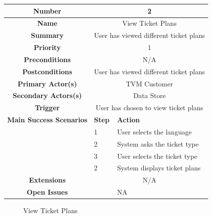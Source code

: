 \documentclass[a4paper,12pt]{report}
\begin{document}
\begin{tabular}{ | c | p{2cm} | p{7cm} |}
	
	\hline
	\textbf{Number} & \multicolumn{2}{c|}{2}  \\
	\hline
	\textbf{Name} & \multicolumn{2}{c|}{View Ticket Plans}  \\
	\hline
	\textbf{Summary} & \multicolumn{2}{c|}{User has viewed different ticket plans}  \\
	\hline
	\textbf{Priority} & \multicolumn{2}{c|}{1}  \\
	\hline
	\textbf{Preconditions} & \multicolumn{2}{c|}{N/A}  \\
	\hline
	\textbf{Postconditions} & \multicolumn{2}{c|}{User has viewed different ticket plans}  \\
	\hline
	\textbf{Primary Actor(s)} & \multicolumn{2}{c|}{TVM Customer}  \\
	\hline
	\textbf{Secondary Actors(s)} & \multicolumn{2}{c|}{Data Store}  \\
	\hline
	\textbf{Trigger} & \multicolumn{2}{c|}{User has chosen to view ticket plans}  \\
	\hline
	\textbf{Main Success Scenarios} & \textbf{Step} & \textbf{Action} \\
	\hline
	& 1 & User selects the language \\ 
	\hline
	&  2  & System asks the ticket type \\
	\hline
	&  3  & User selects the ticket type \\
	\hline
	&  2  & System displays ticket plans \\
	\hline
	\textbf{Extensions} & \multicolumn{2}{c|}{N/A}  \\
	\hline
	\textbf{Open Issues} &    & NA \\
	\hline
	
\end{tabular}

\begin{figure}[!htb]
	\caption{\label{fig:Use Case Model : } View Ticket Plans}	
\end{figure}
\end{document}
